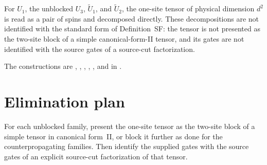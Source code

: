 \documentclass{article}
\begin{document}
For $U_1$, the unblocked $U_3$, $\widetilde U_1$, and $\widetilde U_2$, the
one-site tensor of physical dimension $d^2$ is read as a pair of spins and
decomposed directly. These decompositions are not identified with the
standard form of Definition~SF: the tensor is not presented as the two-site
block of a simple canonical-form-II tensor, and its gates are not identified
with the source gates of a source-cut factorization.

The constructions are
,
,
,
,
, and
 in
.

\section{Elimination plan}

For each unblocked family, present the one-site tensor as the two-site block
of a simple tensor in canonical form~II, or block it further as done for the
counterpropagating families. Then identify the supplied gates with the source
gates of an explicit source-cut factorization of that tensor.



\end{document}

